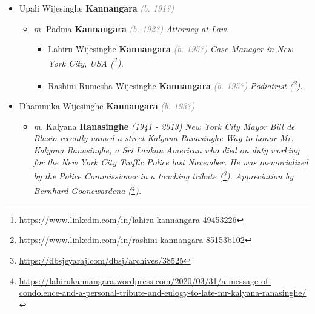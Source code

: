 \documentclass[10pt, openany]{book}
\begin{document}
\begin{itemize}
{\begin{itemize}
{\begin{itemize}
{\begin{itemize}
{\begin{itemize}
{\begin{itemize}
\item{Nelum \textbf{Kannangara} \textcolor{gray}{\textit{(b. 194?)}}
 }
\item{Saman \textbf{Kannangara} \textcolor{gray}{\textit{(b. 195?)}} \textcolor{slmaroon}{\textit{Physician (\footnote{\url{https://www.linkedin.com/in/saman-kannangara-06312715b}}).}}
 }
\end{itemize}}
\end{itemize}
   }
\item{Upali Wijesinghe \textbf{Kannangara} \textcolor{gray}{\textit{(b. 191?)}}
\begin{itemize}
\item{\textit{m.} Padma \textbf{Kannangara} \textcolor{gray}{\textit{(b. 192?)}} \textcolor{slmaroon}{\textit{Attorney-at-Law.}}   \label{couple:00000450:00000458} \begin{itemize}
\item{Lahiru Wijesinghe \textbf{Kannangara} \textcolor{gray}{\textit{(b. 195?)}} \textcolor{slmaroon}{\textit{Case Manager in New York City, USA (\footnote{\url{https://www.linkedin.com/in/lahiru-kannangara-49453226}}).}}
  }
\item{Rashini Rumesha Wijesinghe \textbf{Kannangara} \textcolor{gray}{\textit{(b. 195?)}} \textcolor{slmaroon}{\textit{Podiatrist (\footnote{\url{https://www.linkedin.com/in/rashini-kannangara-85153b102}}).}}
   }
\end{itemize}}
\end{itemize}
  }
\item{Dhammika Wijesinghe \textbf{Kannangara} \textcolor{gray}{\textit{(b. 193?)}}
\begin{itemize}
\item{\textit{m.} Kalyana \textbf{Ranasinghe} \textcolor{slorange}{\textit{(1941 - 2013)}} \textcolor{slmaroon}{\textit{New York City Mayor Bill de Blasio recently named a street Kalyana Ranasinghe Way to honor Mr. Kalyana Ranasinghe, a Sri Lankan American who died on duty working for the New York City Traffic Police last November. He was memorialized by the Police Commissioner in a touching tribute (\footnote{\url{https://dbsjeyaraj.com/dbsj/archives/38525}}).
Appreciation by Bernhard Goonewardena (\footnote{\url{https://lahirukannangara.wordpress.com/2020/03/31/a-message-of-condolence-and-a-personal-tribute-and-eulogy-to-late-mr-kalyana-ranasinghe/}}).}}   \label{couple:00000392:00000630} \begin{itemize}

\end{itemize}}
\end{itemize}}
\end{itemize}}
\end{itemize}}
\end{itemize}}
\end{itemize}
\end{document}
